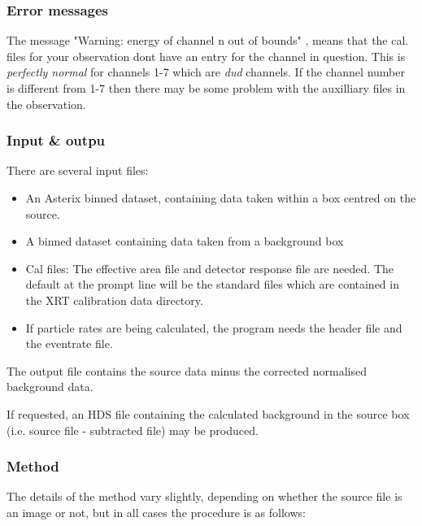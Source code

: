 \documentclass{book}
\renewcommand{\_}{{\tt\char'137}}     %
\begin{document}
\subsubsection{Error messages}
The message "Warning: energy of channel n out of bounds" ,
means that the cal. files for your observation dont have an entry
for the channel in question. This is {\em perfectly normal} for channels
1-7 which are {\em dud} channels. If the channel number is different
from 1-7 then there may be some problem with the auxilliary files
in the observation.
 
\subsubsection{Input \& outpu}
There are several input files:
\begin{itemize}
\item An Asterix binned dataset, containing data taken within a box
centred on the source.
\item A binned dataset containing data taken from a background box
\item Cal files: The effective area file and detector response file
are needed. The default at the prompt line will be the standard
files which are contained in the XRT calibration data directory.
\item If particle rates are being calculated, the program needs the header
file and the eventrate file.
\end{itemize}
The output file contains the source data minus the corrected
normalised background data.
 
If requested, an HDS file containing the calculated background in the
source box (i.e. source file - subtracted file) may be produced.
 
\subsubsection{Method}
The details of the method vary slightly, depending on whether the
source file is an image or not, but in all cases the procedure
is as follows:
 
\end{document}

